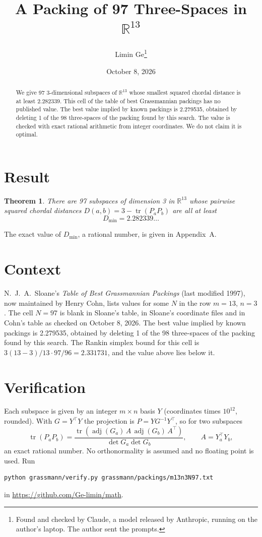 \documentclass[11pt,a4paper]{article}
\title{A Packing of 97 Three-Spaces in $\mathbb{R}^{13}$}
\author{Limin Ge\thanks{Found and checked by Claude, a model released by Anthropic, running on the author's laptop. The author sent the prompts.}}
\date{October 8, 2026}
\newtheorem*{theorem}{Theorem}
\begin{document}
\maketitle
\begin{abstract}
We give 97 3-dimensional subspaces of $\mathbb{R}^{13}$ whose smallest squared chordal distance is at least 2.282339. This cell of the table of best Grassmannian packings has no published value. The best value implied by known packings is 2.279535, obtained by deleting 1 of the 98 three-spaces of the packing found by this search. The value is checked with exact rational arithmetic from integer coordinates. We do not claim it is optimal.
\end{abstract}

\section{Result}
\begin{theorem}
There are 97 subspaces of dimension 3 in $\mathbb{R}^{13}$ whose pairwise squared chordal distances $D(a,b) = 3 - \operatorname{tr}(P_aP_b)$ are all at least
\[ D_{\min} = 2.282339\ldots \]
\end{theorem}
The exact value of $D_{\min}$, a rational number, is given in Appendix~A.


\section{Context}
N.~J.~A.~Sloane's \emph{Table of Best Grassmannian Packings} (last modified 1997), now maintained by Henry Cohn, lists values for some $N$ in the row $m=13$, $n=3$. The cell $N=97$ is blank in Sloane's table, in Sloane's coordinate files and in Cohn's table as checked on October 8, 2026. The best value implied by known packings is 2.279535, obtained by deleting 1 of the 98 three-spaces of the packing found by this search. The Rankin simplex bound for this cell is $3(13-3)/13\cdot 97/96 = 2.331731$, and the value above lies below it.


\section{Verification}
Each subspace is given by an integer $m\times n$ basis $Y$ (coordinates times $10^{12}$, rounded). With $G=Y^\top Y$ the projection is $P=YG^{-1}Y^\top$, so for two subspaces
\[ \operatorname{tr}(P_aP_b)=\frac{\operatorname{tr}(\operatorname{adj}(G_a)\,A\,\operatorname{adj}(G_b)\,A^\top)}{\det G_a\det G_b},\qquad A=Y_a^\top Y_b, \]
an exact rational number. No orthonormality is assumed and no floating point is used. Run
\begin{verbatim}
python grassmann/verify.py grassmann/packings/m13n3N97.txt
\end{verbatim}
in \url{https://github.com/Ge-limin/math}.
\end{document}
